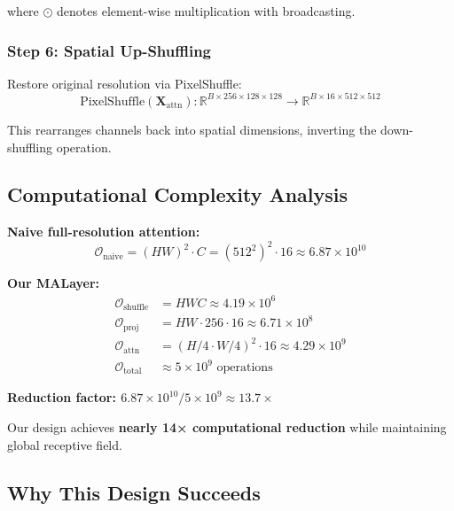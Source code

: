 \documentclass[conference]{IEEEtran}
\begin{document}
where $\odot$ denotes element-wise multiplication with broadcasting.

\subsubsection{Step 6: Spatial Up-Shuffling}

Restore original resolution via PixelShuffle:
\begin{equation}
\text{PixelShuffle}(\mathbf{X}_{\text{attn}}) : \mathbb{R}^{B \times 256 \times 128 \times 128} \rightarrow \mathbb{R}^{B \times 16 \times 512 \times 512}
\end{equation}

This rearranges channels back into spatial dimensions, inverting the down-shuffling operation.

\subsection{Computational Complexity Analysis}

\textbf{Naive full-resolution attention:}
\begin{equation}
\mathcal{O}_{\text{naive}} = (HW)^2 \cdot C = (512^2)^2 \cdot 16 \approx 6.87 \times 10^{10}
\end{equation}

\textbf{Our MALayer:}
\begin{align}
\mathcal{O}_{\text{shuffle}} &= HWC \approx 4.19 \times 10^6 \\
\mathcal{O}_{\text{proj}} &= HW \cdot 256 \cdot 16 \approx 6.71 \times 10^8 \\
\mathcal{O}_{\text{attn}} &= (H/4 \cdot W/4)^2 \cdot 16 \approx 4.29 \times 10^9 \\
\mathcal{O}_{\text{total}} &\approx 5 \times 10^9 \text{ operations}
\end{align}

\textbf{Reduction factor: $6.87 \times 10^{10} / 5 \times 10^9 \approx 13.7\times$}

Our design achieves \textbf{nearly 14× computational reduction} while maintaining global receptive field.

\subsection{Why This Design Succeeds}
\end{document}
